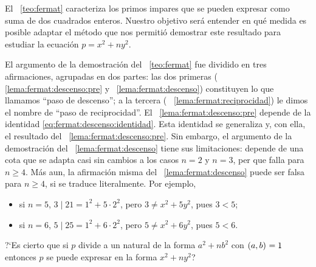 \theoremstyle{plain}
\newtheorem{teoEcuacion}{\teoname}[section]
\newtheorem{lemaEcuacion}[teoEcuacion]{\lemaname}

\theoremstyle{definition}
\newtheorem{defEcuacion}[teoEcuacion]{}
\newtheorem{obsEcuacion}[teoEcuacion]{\obsname}
\newtheorem{pregEcuacion}[teoEcuacion]{\pregname}


El \teoname~\ref{teo:fermat} caracteriza los primos impares que se pueden
expresar como suma de dos cuadrados enteros. Nuestro objetivo ser\'a entender
en qu\'e medida es posible adaptar el m\'etodo que nos permiti\'o demostrar
este resultado para estudiar la ecuaci\'on $p=x^2+ny^2$.

El argumento de la demostraci\'on del \teoname~\ref{teo:fermat} fue dividido
en tres afirmaciones, agrupadas en dos partes: las dos primeras (\lemaname~%
\ref{lema:fermat:descenso:pre} y \lemaname~\ref{lema:fermat:descenso})
constituyen lo que llamamos ``paso de descenso''; a la tercera (\lemaname~%
\ref{lema:fermat:reciprocidad}) le dimos el nombre de ``paso de reciprocidad''.
El \lemaname~\ref{lema:fermat:descenso:pre} depende de la identidad
\eqref{eq:fermat:descenso:identidad}. Esta identidad se generaliza y, con ella,
el resultado del \lemaname~\ref{lema:fermat:descenso:pre}. Sin embargo, el
argumento de la demostraci\'on del \lemaname~\ref{lema:fermat:descenso} tiene
sus limitaciones: depende de una cota que se adapta casi sin cambios a los
casos $n=2$ y $n=3$, per que falla para $n\geq 4$. M\'as aun, la afirmaci\'on
misma del \lemaname~\ref{lema:fermat:descenso} puede ser falsa para $n\geq 4$,
si se traduce literalmente. Por ejemplo,
\begin{itemize}
	\item si $n=5$, $3\mid 21=1^2+5\cdot 2^2$, pero $3\neq x^2+5y^2$,
		pues $3<5$;
	\item si $n=6$, $5\mid 25=1^2+6\cdot 2^2$, pero $5\neq x^2+6y^2$,
		pues $5<6$.
\end{itemize}
%
?`Es cierto que si $p$ divide a un natural de la forma $a^2+nb^2$ con
$\left({a,b}\right)_{}=1$ entonces $p$ se puede expresar en la forma $x^2+ny^2$?

